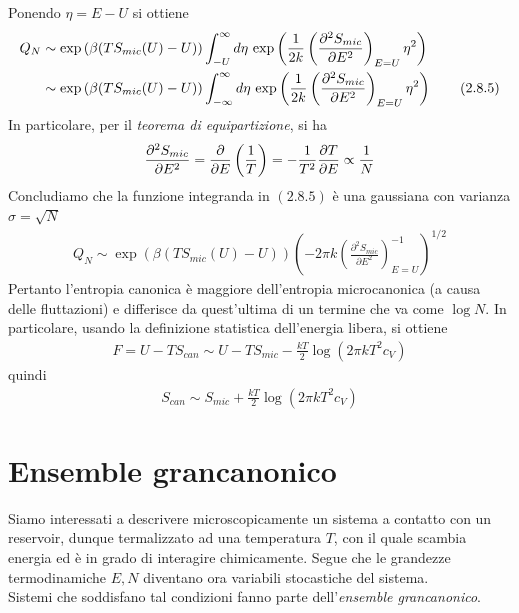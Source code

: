 \documentclass{article}
\begin{document}
Ponendo $\eta = E - U$ si ottiene 
\begin{align}
    Q_N &\sim \exp\left(\beta(TS_{mic}(U) - U)\right)\int_{-U}^\infty d\eta \, \exp\left(\frac{1}{2k}\left(\frac{\partial^2S_{mic}}{\partial E^2}\right)_{E = U}\eta^2\right) \notag \\
    &\sim \exp\left(\beta(TS_{mic}(U) - U)\right)\int_{-\infty}^\infty d\eta \, \exp\left(\frac{1}{2k}\left(\frac{\partial^2S_{mic}}{\partial E^2}\right)_{E = U}\eta^2\right) \tag{2.8.5}
\end{align}
In particolare, per il \textit{teorema di equipartizione}, si ha
\begin{align}
    \frac{\partial^2S_{mic}}{\partial E^2} = \frac{\partial}{\partial E}\left(\frac{1}{T}\right) = -\frac{1}{T^2}\frac{\partial T}{\partial E} \propto \frac{1}{N} \notag
\end{align}
Concludiamo che la funzione integranda in $(2.8.5)$ è una gaussiana con varianza $\sigma = \sqrt{N}$ 
\begin{align}
    Q_N \sim \exp\left(\beta(TS_{mic}(U) - U)\right)\left(-2\pi k\left(\frac{\partial^2S_{mic}}{\partial E^2}\right)^{-1}_{E = U}\right)^{1/2} \tag{2.8.6}
\end{align}
Pertanto l'entropia canonica è maggiore dell'entropia microcanonica (a causa delle fluttazioni) e differisce da quest'ultima di un termine che va come $\log N$. In particolare, usando la definizione statistica dell'energia libera, si ottiene 
\begin{align}
    F = U - TS_{can} \sim U - TS_{mic} - \frac{kT}{2}\log\left(2\pi kT^2c_V\right) \tag{2.8.7}
\end{align}
quindi 
\begin{align}
    S_{can} \sim S_{mic} + \frac{kT}{2}\log\left(2\pi kT^2c_V\right) \tag{2.8.8}
\end{align}

\newpage
\section{Ensemble grancanonico}
Siamo interessati a descrivere microscopicamente un sistema a contatto con un reservoir, dunque termalizzato ad una temperatura $T$, con il quale scambia energia ed è in grado di interagire chimicamente. Segue che le grandezze termodinamiche $E, N$ diventano ora variabili stocastiche del sistema. \\
Sistemi che soddisfano tal condizioni fanno parte dell'\textit{ensemble grancanonico}.
\end{document}
